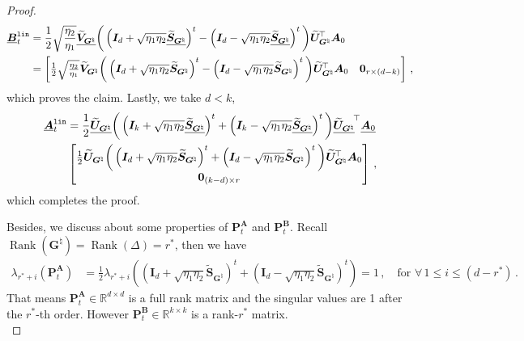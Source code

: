 \begin{proof}
    \begin{align*}
        \underline{\bm B}^{\tt lin}_t & = \frac{1}{2}\sqrt{\frac{\eta_2}{\eta_1}}\underline{\widetilde{\bm V}_{\bm G^\natural}}\bigg(\left(\bm I_d + \sqrt{\eta_1 \eta_2}\underline{\widetilde{\bm S}_{\bm G^\natural}}\right)^t - \left(\bm I_d - \sqrt{\eta_1 \eta_2}\underline{\widetilde{\bm S}_{\bm G^\natural}}\right)^t\bigg)\widetilde{\bm U}_{\bm G^\natural}^{\!\top}\bm A_0\\
        & = \begin{bmatrix}
            \frac{1}{2}\sqrt{\frac{\eta_2}{\eta_1}}\widetilde{\bm V}_{\bm G^\natural}\bigg(\left(\bm I_d + \sqrt{\eta_1 \eta_2}\widetilde{\bm S}_{\bm G^\natural}\right)^t - \left(\bm I_d - \sqrt{\eta_1 \eta_2}\widetilde{\bm S}_{\bm G^\natural}\right)^t\bigg)\widetilde{\bm U}_{\bm G^\natural}^{\!\top}\bm A_0 & \bm 0_{r \times (d-k)}
        \end{bmatrix}\,,
    \end{align*}
    which proves the claim. Lastly, we take $d<k$,
    \begin{align*}
        \underline{\bm A}^{\tt lin}_t & = \frac{1}{2}\underline{\widetilde{\bm U}_{\bm G^\natural}}\bigg(\left(\bm I_k + \sqrt{\eta_1 \eta_2}\underline{\widetilde{\bm S}_{\bm G^\natural}}\right)^t + \left(\bm I_k - \sqrt{\eta_1 \eta_2}\underline{\widetilde{\bm S}_{\bm G^\natural}}\right)^t\bigg)\underline{\widetilde{\bm U}_{\bm G^\natural}}^{\!\top}\underline{\bm A_0}\\
        & \begin{bmatrix}
            \frac{1}{2}\widetilde{\bm U}_{\bm G^\natural}\bigg(\left(\bm I_d + \sqrt{\eta_1 \eta_2}\widetilde{\bm S}_{\bm G^\natural}\right)^t + \left(\bm I_d - \sqrt{\eta_1 \eta_2}\widetilde{\bm S}_{\bm G^\natural}\right)^t\bigg)\widetilde{\bm U}_{\bm G^\natural}^{\!\top}\bm A_0 \\
            \bm 0_{(k-d) \times r}
        \end{bmatrix}\,,
    \end{align*}
    which completes the proof.

    Besides, we discuss about some properties of $\bm P_t^{\bm A}$ and $\bm P_t^{\bm B}$. Recall $\operatorname{Rank}({\bm G}^{\natural}) = \operatorname{Rank}(\Delta) = r^*$, then we have
    \begin{align*}
        \lambda_{r^*+i}(\bm P_t^{\bm A}) & = \frac{1}{2}\lambda_{r^*+i}\left((\bm I_d+\sqrt{\eta_1 \eta_2}\widetilde{\bm S}_{\bm G^\natural})^t + (\bm I_d-\sqrt{\eta_1 \eta_2}\widetilde{\bm S}_{\bm G^\natural})^t\right)=1\,,\quad \text{for }\forall\,1\leq i \leq (d-r^*)\,.
    \end{align*}
   That means $ \bm P_t^{\bm A} \in \mathbb{R}^{d \times d}$ is a full rank matrix and the  singular values are 1 after the $r^*$-th order. However $ \bm P_t^{\bm B} \in \mathbb{R}^{k \times k} $ is a rank-$r^*$ matrix.\\
\end{proof}

